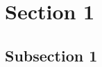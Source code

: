 \documentclass[twoside,a4paper,article]{combine}
\begin{document}


\begin{abstract}
\blindtext
\end{abstract}

\tableofcontents
\newpage

\section{Section 1}

\blindtext

\subsection{Subsection 1}

\Blindtext




\end{document}

